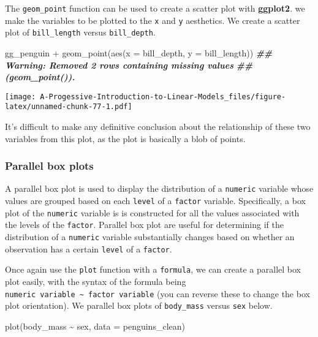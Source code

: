 \documentclass[
]{book}
\newenvironment{Shaded}{\begin{snugshade}}{\end{snugshade}}
\newcommand{\AttributeTok}[1]{\textcolor[rgb]{0.77,0.63,0.00}{#1}}
\newcommand{\DocumentationTok}[1]{\textcolor[rgb]{0.56,0.35,0.01}{\textbf{\textit{#1}}}}
\newcommand{\FunctionTok}[1]{\textcolor[rgb]{0.00,0.00,0.00}{#1}}
\newcommand{\NormalTok}[1]{#1}
\newcommand{\SpecialCharTok}[1]{\textcolor[rgb]{0.00,0.00,0.00}{#1}}
\theoremstyle{definition}
\theoremstyle{definition}
\theoremstyle{definition}
\theoremstyle{definition}
\theoremstyle{remark}
\begin{document}
The \texttt{geom\_point} function can be used to create a scatter plot with \textbf{ggplot2}. we make the variables to be plotted to the \texttt{x} and \texttt{y} aesthetics. We create a scatter plot of \texttt{bill\_length} versus \texttt{bill\_depth}.

\begin{Shaded}
\begin{Highlighting}[]
\NormalTok{gg\_penguin }\SpecialCharTok{+} \FunctionTok{geom\_point}\NormalTok{(}\FunctionTok{aes}\NormalTok{(}\AttributeTok{x =}\NormalTok{ bill\_depth, }\AttributeTok{y =}\NormalTok{ bill\_length))}
\DocumentationTok{\#\# Warning: Removed 2 rows containing missing values}
\DocumentationTok{\#\# (\textasciigrave{}geom\_point()\textasciigrave{}).}
\end{Highlighting}
\end{Shaded}

\texttt{[image: A-Progessive-Introduction-to-Linear-Models\_files/figure-latex/unnamed-chunk-77-1.pdf]}

It's difficult to make any definitive conclusion about the relationship of these two variables from this plot, as the plot is basically a blob of points.

\hypertarget{parallel-box-plots}{%
\subsubsection{Parallel box plots}\label{parallel-box-plots}}

A parallel box plot is used to display the distribution of a \texttt{numeric} variable whose values are grouped based on each \texttt{level} of a \texttt{factor} variable. Specifically, a box plot of the \texttt{numeric} variable is is constructed for all the values associated with the levels of the \texttt{factor}. Parallel box plot are useful for determining if the distribution of a \texttt{numeric} variable substantially changes based on whether an observation has a certain \texttt{level} of a \texttt{factor}.

Once again use the \texttt{plot} function with a \texttt{formula}, we can create a parallel box plot easily, with the syntax of the formula being \texttt{numeric\ variable\ \textasciitilde{}\ factor\ variable} (you can reverse these to change the box plot orientation). We parallel box plots of \texttt{body\_mass} versus \texttt{sex} below.

\begin{Shaded}
\begin{Highlighting}[]
\FunctionTok{plot}\NormalTok{(body\_mass }\SpecialCharTok{\textasciitilde{}}\NormalTok{ sex, }\AttributeTok{data =}\NormalTok{ penguins\_clean)}
\end{Highlighting}
\end{Shaded}
\end{document}
